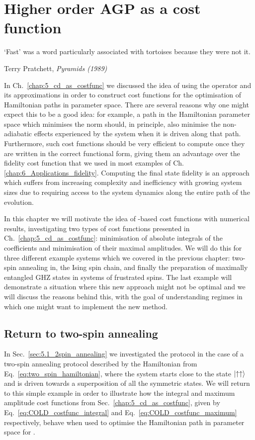 \chapter{Higher order AGP as a cost function}\label{chap:7_higher_order_agp}

\epigraph{`Fast' was a word particularly associated with tortoises because they were not it.}{Terry Pratchett, \emph{Pyramids (1989)}}

In Ch.~\ref{chap:5_cd_as_costfunc} we discussed the idea of using the  operator and its approximations in order to construct cost functions for the optimisation of Hamiltonian paths in parameter space. There are several reasons why one might expect this to be a good idea: for example, a path in the Hamiltonian parameter space which minimises the  norm should, in principle, also minimise the non-adiabatic effects experienced by the system when it is driven along that path. Furthermore, such cost functions should be very efficient to compute once they are written in the correct functional form, giving them an advantage over the fidelity cost function that we used in most examples of Ch.\ref{chap:6_Applications_fidelity}. Computing the final state fidelity is an approach which suffers from increasing complexity and inefficiency with growing system sizes due to requiring access to the system dynamics along the entire path of the evolution.

In this chapter we will motivate the idea of -based cost functions with numerical results, investigating two types of cost functions presented in Ch.~\ref{chap:5_cd_as_costfunc}: minimisation of absolute integrals of the  coefficients and minimisation of their maximal amplitudes. We will do this for three different example systems which we covered in the previous chapter: two-spin annealing in, the Ising spin chain, and finally the preparation of maximally entangled GHZ states in systems of frustrated spins. The last example will demonstrate a situation where this new approach might not be optimal and we will discuss the reasons behind this, with the goal of understanding regimes in which one might want to implement the new method. 

\section{Return to two-spin annealing}\label{sec:7.1_two_spin_ho}

In Sec.~\ref{sec:5.1_2spin_annealing} we investigated the  protocol in the case of a two-spin annealing protocol described by the Hamiltonian from Eq.~\eqref{eq:two_spin_hamiltonian}, where the system starts close to the state $\ket{\uparrow\uparrow}$ and is driven towards a superposition of all the symmetric states. We will return to this simple example in order to illustrate how the integral and maximum amplitude cost functions from Sec.~\ref{chap:5_cd_as_costfunc}, given by Eq.~\eqref{eq:COLD_costfunc_integral} and Eq.~\eqref{eq:COLD_costfunc_maximum} respectively, behave when used to optimise the Hamiltonian path in parameter space for .

